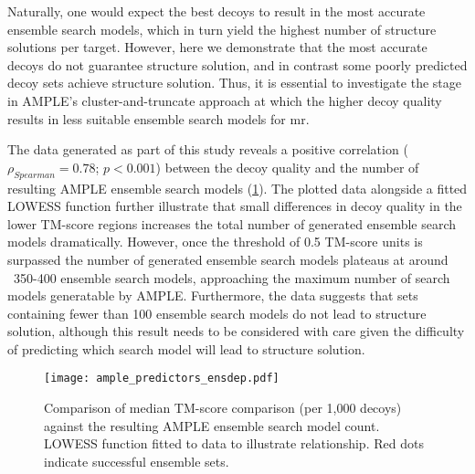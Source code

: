 Naturally, one would expect the best decoys to result in the most accurate ensemble search models, which in turn yield the highest number of structure solutions per target. However, here we demonstrate that the most accurate decoys do not guarantee structure solution, and in contrast some poorly predicted decoy sets achieve structure solution. Thus, it is essential to investigate the stage in AMPLE's cluster-and-truncate approach at which the higher decoy quality results in less suitable ensemble search models for \gls{mr}.

The data generated as part of this study reveals a positive correlation ($\rho_{Spearman}=0.78$; $p<0.001$) between the decoy quality and the number of resulting AMPLE ensemble search models (\cref{fig:ample_predictor_ensdep}). The plotted data alongside a fitted LOWESS function further illustrate that small differences in decoy quality in the lower TM-score regions increases the total number of generated ensemble search models dramatically. However, once the threshold of 0.5 TM-score units \cite{Xu2010-kr} is surpassed the number of generated ensemble search models plateaus at around ~350-400 ensemble search models, approaching the maximum number of search models generatable by AMPLE. Furthermore, the data suggests that sets containing fewer than 100 ensemble search models do not lead to structure solution, although this result needs to be considered with care given the difficulty of predicting which search model will lead to structure solution.

\begin{figure}[H]
    \centering
    \texttt{[image: ample\_predictors\_ensdep.pdf]}
    \caption{Comparison of median TM-score comparison (per 1,000 decoys) against the resulting AMPLE ensemble search model count. LOWESS function fitted to data to illustrate relationship. Red dots indicate successful ensemble sets.}
    \label{fig:ample_predictor_ensdep}
\end{figure}

